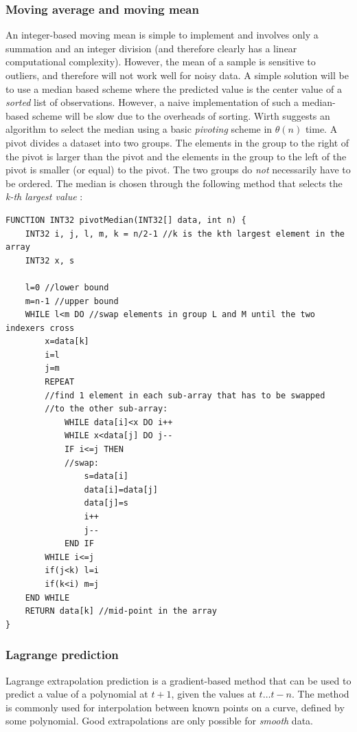  \subsubsection{Moving average and moving mean}
  An integer-based moving mean is simple to implement and involves only a summation and an integer division (and therefore clearly has a linear computational complexity).
  However, the mean of a sample is sensitive to outliers, and therefore will not work well for noisy data. A simple solution will be to use a median based scheme
  where the predicted value is the center value of a \textit{sorted} list of observations. However, a naive implementation of such a median-based scheme will
  be slow due to the overheads of sorting. Wirth \cite{wirth76} suggests an algorithm to select the median using a basic \textit{pivoting} scheme in $\theta(n)$
  time. A pivot divides a dataset into two groups. The elements in the group to the right of the pivot is larger than the pivot and the elements in the group to
  the left of the pivot is smaller (or equal) to the pivot. The two groups do \emph{not} necessarily have to be ordered. The median is chosen through the following
  method that selects the \textit{k-th largest value} \cite{wirth76}:
  \begin{verbatim}
FUNCTION INT32 pivotMedian(INT32[] data, int n) {
    INT32 i, j, l, m, k = n/2-1 //k is the kth largest element in the array
    INT32 x, s

    l=0 //lower bound
    m=n-1 //upper bound
    WHILE l<m DO //swap elements in group L and M until the two indexers cross
        x=data[k]
        i=l
        j=m
        REPEAT
	    //find 1 element in each sub-array that has to be swapped
	    //to the other sub-array:
            WHILE data[i]<x DO i++
            WHILE x<data[j] DO j--
            IF i<=j THEN
		    //swap:
                s=data[i]
                data[i]=data[j]
                data[j]=s
                i++
                j--
            END IF
        WHILE i<=j
        if(j<k) l=i
        if(k<i) m=j
    END WHILE
    RETURN data[k] //mid-point in the array
}
  \end{verbatim}
 \subsubsection{Lagrange prediction}
  Lagrange extrapolation prediction is a gradient-based method that can be used to predict a value of a polynomial at $t+1$, given the values at $t\dots t-n$.
  The method is commonly used for interpolation between known points on a curve, defined by some polynomial. Good extrapolations are only possible for 
  \textit{smooth} data.
  
